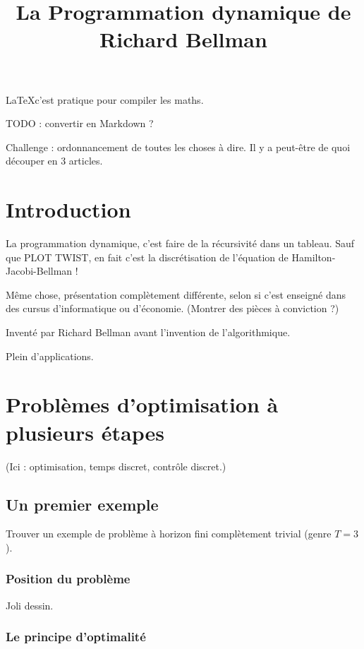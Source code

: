 \documentclass[a4paper, 11pt]{article}
\begin{document}
\title{La Programmation dynamique de Richard Bellman}
\maketitle

\LaTeX c'est pratique pour compiler les maths.

TODO : convertir en Markdown ?

Challenge : ordonnancement de toutes les choses à dire.
Il y a peut-être de quoi découper en 3 articles.

\section{Introduction}

La programmation dynamique, c'est faire de la récursivité dans un tableau. Sauf
que PLOT TWIST, en fait c'est la discrétisation de l'équation de
Hamilton-Jacobi-Bellman !

Même chose, présentation complètement différente, selon si c'est enseigné dans
des cursus d'informatique ou d'économie. (Montrer des pièces à conviction ?)

Inventé par Richard Bellman avant l'invention de l'algorithmique.

Plein d'applications.


\section{Problèmes d'optimisation à plusieurs étapes}

(Ici : optimisation, temps discret, contrôle discret.)

\subsection{Un premier exemple}

Trouver un exemple de problème à horizon fini complètement trivial (genre $T = 3$).

\subsubsection{Position du problème}

Joli dessin.

\subsubsection{Le principe d'optimalité}
\end{document}
